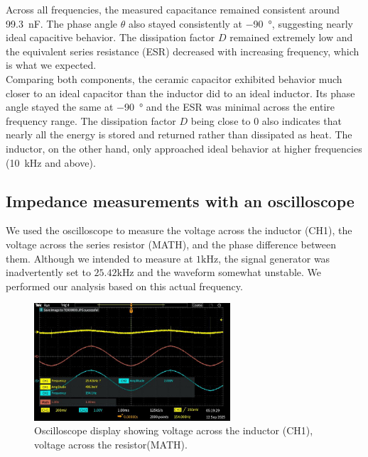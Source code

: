 \documentclass{article}
\begin{document}
\noindent Across all frequencies, the measured capacitance remained  
consistent around \SI{99.3}{\nano\farad}. The phase angle $\theta$ also stayed consistently at \SI{-90}{\degree}, suggesting nearly ideal capacitive behavior. The dissipation factor $D$ remained extremely low and the equivalent series resistance (ESR) decreased with increasing frequency, which is what we expected.\\

\noindent Comparing both components, the ceramic capacitor exhibited behavior 
much closer to an ideal capacitor than the inductor did to an ideal inductor. 
Its phase angle stayed the same at \SI{-90}{\degree} and the ESR was minimal 
across the entire frequency range. The dissipation factor $D$ being close to $0$ 
also indicates that nearly all the energy is stored and returned rather than 
dissipated as heat. The inductor, on the other hand, only approached ideal 
behavior at higher frequencies (\SI{10}{\kilo\hertz} and above).



\subsection{Impedance measurements with an oscilloscope}
 
We used the oscilloscope to measure the voltage across the inductor (CH1), 
the voltage across the series resistor (MATH), and the phase difference 
between them. Although we intended to measure at $1\si{\kilo\hertz}$, the
signal generator was inadvertently set to $25.42\si{\kilo\hertz}$ and the
waveform somewhat unstable. We performed our analysis based on this actual
frequency.

\begin{figure}[H]
    \centering
    \includegraphics[width=0.65\textwidth]{3.b.png}
    \caption{Oscilloscope display showing voltage across the inductor (CH1), 
    voltage across the resistor(MATH).}
    \label{fig:scope_inductor}
\end{figure}
\end{document}

